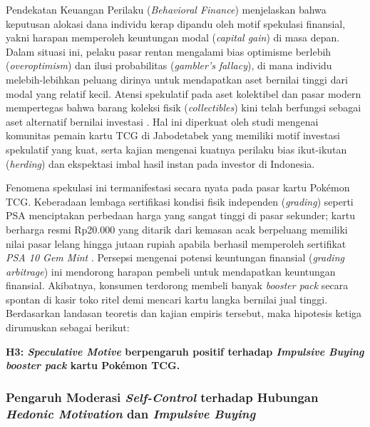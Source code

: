 \documentclass[12pt,a4paper]{article}
\numberwithin{equation}{section}
\numberwithin{table}{section}
\numberwithin{figure}{section}
\begin{document}
Pendekatan Keuangan Perilaku (\emph{Behavioral Finance}) \citep{shiller2000irrational, gachter2022individual} menjelaskan bahwa keputusan alokasi dana individu kerap dipandu oleh motif spekulasi finansial, yakni harapan memperoleh keuntungan modal (\emph{capital gain}) di masa depan. Dalam situasi ini, pelaku pasar rentan mengalami bias optimisme berlebih (\emph{overoptimism}) dan ilusi probabilitas (\emph{gambler's fallacy}), di mana individu melebih-lebihkan peluang dirinya untuk mendapatkan aset bernilai tinggi dari modal yang relatif kecil. Atensi spekulatif pada aset kolektibel dan pasar modern \citep{alfina2023fomo} mempertegas bahwa barang koleksi fisik (\emph{collectibles}) kini telah berfungsi sebagai aset alternatif bernilai investasi \citep{baur2018bitcoin}. Hal ini diperkuat oleh studi \citet{aryadi2024personal} mengenai komunitas pemain kartu TCG di Jabodetabek yang memiliki motif investasi spekulatif yang kuat, serta kajian \citet{colline2024biases} mengenai kuatnya perilaku bias ikut-ikutan (\emph{herding}) dan ekspektasi imbal hasil instan pada investor di Indonesia.

Fenomena spekulasi ini termanifestasi secara nyata pada pasar kartu Pok\'emon TCG. Keberadaan lembaga sertifikasi kondisi fisik independen (\emph{grading}) seperti PSA menciptakan perbedaan harga yang sangat tinggi di pasar sekunder; kartu berharga resmi Rp20.000 yang ditarik dari kemasan acak berpeluang memiliki nilai pasar lelang hingga jutaan rupiah apabila berhasil memperoleh sertifikat \emph{PSA 10 Gem Mint} \citep{pricecharting2024}. Persepsi mengenai potensi keuntungan finansial (\emph{grading arbitrage}) ini mendorong harapan pembeli untuk mendapatkan keuntungan finansial. Akibatnya, konsumen terdorong membeli banyak \emph{booster pack} secara spontan di kasir toko ritel demi mencari kartu langka bernilai jual tinggi. Berdasarkan landasan teoretis dan kajian empiris tersebut, maka hipotesis ketiga dirumuskan sebagai berikut:

\vspace{0.2cm}
\textbf{H3: \emph{Speculative Motive} berpengaruh positif terhadap \emph{Impulsive Buying} \emph{booster pack} kartu Pok\'emon TCG.}

\subsubsection{Pengaruh Moderasi \emph{Self-Control} terhadap Hubungan \emph{Hedonic Motivation} dan \emph{Impulsive Buying}}
\end{document}
